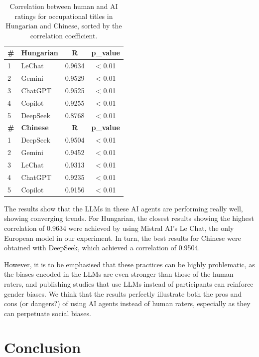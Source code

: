 \documentclass[11pt]{article}
\begin{document}
\begin{table}
  \caption{Correlation between human and AI ratings for occupational titles in Hungarian and Chinese, sorted by the correlation coefficient.}
  \centering
  \begin{tabular}{@{}l|l|c|c@{}}
    \textbf{\#} & \textbf{Hungarian} & \textbf{R} & \textbf{p\_value} \\
    \hline
    1 & LeChat & 0.9634 & < 0.01 \\
    2 & Gemini & 0.9529 & < 0.01 \\
    3 & ChatGPT & 0.9525 & < 0.01 \\
    4 & Copilot & 0.9255 & < 0.01 \\
    5 & DeepSeek & 0.8768 & < 0.01 \\

    \textbf{\#} & \textbf{Chinese} & \textbf{R} & \textbf{p\_value} \\
    \hline
    1 & DeepSeek & 0.9504 & < 0.01 \\
    2 & Gemini & 0.9452 & < 0.01 \\
    3 & LeChat & 0.9313 & < 0.01 \\
    4 & ChatGPT & 0.9235 & < 0.01 \\
    5 & Copilot & 0.9156 & < 0.01 \\
  \end{tabular}
  \label{tab:correlation}
\end{table}

The results show that the LLMs in these AI agents are performing really well, showing converging trends. For Hungarian, the closest results showing the highest correlation of 0.9634 were achieved by using Mistral AI's Le Chat, the only European model in our experiment. In turn, the best results for Chinese were obtained with DeepSeek, which achieved a correlation of 0.9504. 

However, it is to be emphasised that these practices can be highly problematic, as the biases encoded in the LLMs are even stronger than those of the human raters, and publishing studies that use LLMs instead of participants can reinforce gender biases. We think that the results perfectly illustrate both the pros and cons (or dangers?) of using AI agents instead of human raters, especially as they can perpetuate social biases.



\section{Conclusion}
\end{document}
